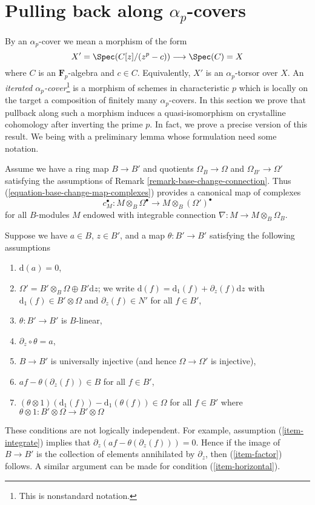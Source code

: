 \section{Pulling back along $\alpha_p$-covers}
\label{section-pull-back-along-pth-root}

\noindent
By an $\alpha_p$-cover we mean a morphism of the form
$$
X' = \Spec(C[z]/(z^p - c)) \longrightarrow \Spec(C) = X
$$
where $C$ is an $\mathbf{F}_p$-algebra and $c \in C$. Equivalently,
$X'$ is an $\alpha_p$-torsor over $X$. An {\it iterated
$\alpha_p$-cover}\footnote{This is nonstandard notation.}
is a morphism of schemes in characteristic
$p$ which is locally on the target a composition of finitely many
$\alpha_p$-covers. In this section we prove that pullback along
such a morphism induces a quasi-isomorphism on crystalline cohomology
after inverting the prime $p$. In fact, we prove a precise version
of this result. We being with a preliminary lemma whose formulation
need some notation.

\medskip\noindent
Assume we have a ring map $B \to B'$ and quotients $\Omega_B \to \Omega$ and
$\Omega_{B'} \to \Omega'$ satisfying the assumptions of
Remark \ref{remark-base-change-connection}.
Thus (\ref{equation-base-change-map-complexes}) provides a
canonical map of complexes
$$
c_M^\bullet :
M \otimes_B \Omega^\bullet
\longrightarrow
M \otimes_B (\Omega')^\bullet
$$
for all $B$-modules $M$ endowed with integrable connection
$\nabla : M \to M \otimes_B \Omega_B$.

\medskip\noindent
Suppose we have $a \in B$, $z \in B'$, and a map $\theta : B' \to B'$
satisfying the following assumptions
\begin{enumerate}
\item
\label{item-d-a-zero}
$\text{d}(a) = 0$,
\item
\label{item-direct-sum}
$\Omega' = B' \otimes_B \Omega \oplus B'\text{d}z$; we write
$\text{d}(f) = \text{d}_1(f) + \partial_z(f) \text{d}z$
with $\text{d}_1(f) \in B' \otimes \Omega$ and $\partial_z(f) \in N'$
for all $f \in B'$,
\item
\label{item-theta-linear}
$\theta : B' \to B'$ is $B$-linear,
\item
\label{item-integrate}
$\partial_z \circ \theta = a$,
\item
\label{item-injective}
$B \to B'$ is universally injective (and hence $\Omega \to \Omega'$
is injective),
\item
\label{item-factor}
$af - \theta(\partial_z(f)) \in B$ for all $f \in B'$,
\item
\label{item-horizontal}
$(\theta \otimes 1)(\text{d}_1(f)) - \text{d}_1(\theta(f)) \in \Omega$
for all $f \in B'$ where
$\theta \otimes 1 : B' \otimes \Omega \to B' \otimes \Omega$
\end{enumerate}
These conditions are not logically independent.
For example, assumption (\ref{item-integrate}) implies
that $\partial_z(af - \theta(\partial_z(f))) = 0$.
Hence if the image of $B \to B'$ is the collection of
elements annihilated by $\partial_z$, then (\ref{item-factor})
follows. A similar argument can be made for condition (\ref{item-horizontal}).

